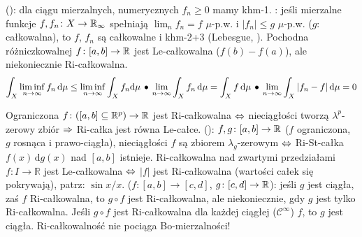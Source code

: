   (): dla ciągu mierzalnych, numerycznych $f_n \ge 0$ mamy khm-1.
: jeśli mierzalne funkcje $f, f_n \colon X \to \mathbb{R}_\infty$ spełniają $\lim_n f_n = f$ $\mu$-p.w. i $|f_n| \le g$ $\mu$-p.w. ($g$: całkowalna), to $f$, $f_n$ są całkowalne i khm-2+3 (Lebesgue, ).
Pochodna różniczkowalnej $f \colon [a,b] \to \mathbb{R}$ jest Le-całkowalna ($f(b) - f(a)$), ale niekoniecznie Ri-całkowalna.
\[
	\int_X \liminf_{n \to \infty} f_n \,\textrm{d}\mu \le \liminf_{n \to \infty}\int_X f_n\textrm{d}\mu \, \bullet \,
	\lim_{n \to \infty} \int_X f_n \,\textrm{d}\mu = \int_X f \,\textrm{d}\mu \, \bullet \,
	\lim_{n \to \infty} \int_X |f_n-f| \,\textrm{d}\mu = 0
\]

Ograniczona  $f \colon ([a, b] \subseteq \mathbb{R}^p) \to \mathbb{R}$ jest Ri-całkowalna $\Leftrightarrow$ nieciągłości tworzą $\lambda^p$-zerowy zbiór $\Rightarrow$ Ri-całka jest równa Le-całce.
 (): $f, g \colon [a, b] \to \mathbb{R}$ ($f$ ograniczona, $g$ rosnąca i prawo-ciągła), nieciągłości $f$ są zbiorem $\lambda_g$-zerowym $\Leftrightarrow$ Ri-St-całka $f(x) \,\textrm{d} g(x)$ nad $[a,b]$ istnieje.
Ri-całkowalna nad zwartymi przedziałami $f \colon I \to \mathbb R$ jest Le-całkowalna $\Leftrightarrow$ $|f|$ jest Ri-całkowalna (wartości całek się pokrywają), patrz: $\sin x / x$.
($f \colon [a,b] \to [c,d]$, $g \colon [c,d] \to \mathbb{R}$): jeśli $g$ jest ciągła, zaś $f$ Ri-całkowalna, to $g \circ f$ jest Ri-całkowalna, ale niekoniecznie, gdy $g$ jest tylko Ri-całkowalna.
Jeśli $g \circ f$ jest Ri-całkowalna dla każdej ciągłej ($\mathcal C^\infty$) $f$, to $g$ jest ciągła.
Ri-całkowalność nie pociąga Bo-mierzalności!